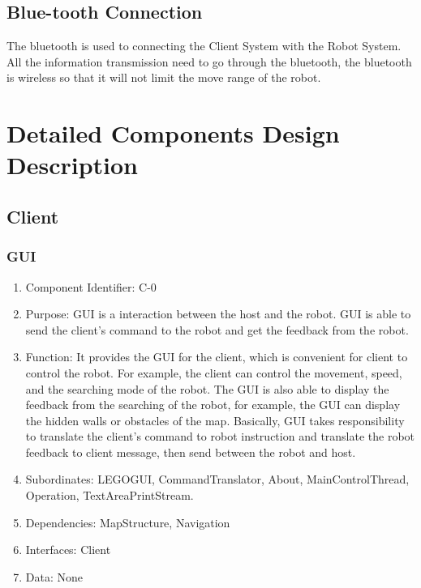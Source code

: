 \documentclass[11pt, a4paper]{report}
\begin{document}
\subsection{Blue-tooth Connection}
The bluetooth is used to connecting the Client System with the Robot System. All the information transmission need to go through the bluetooth, the bluetooth is wireless so that it will not limit the move range of the robot.   



\section{Detailed Components Design Description}
\subsection{Client}
\subsubsection{GUI}
\begin{enumerate}
\item Component Identifier: C-0
\item Purpose: GUI is a interaction between the host and the robot. GUI is able to send the client's command to the robot and get the feedback from the robot.  
\item Function: It provides the GUI for the client, which is convenient for client to control the robot. For example, the client can control the movement, speed, and the searching mode of the robot. The GUI is also able to display the feedback from the searching of the robot, for example, the GUI can display the hidden walls or obstacles of the map. Basically, GUI takes responsibility to translate the client's command to robot instruction and translate the robot feedback to client message, then send between the robot and host.   
\item Subordinates: LEGOGUI, CommandTranslator, About, MainControlThread, Operation, TextAreaPrintStream. 
\item Dependencies: MapStructure, Navigation
\item Interfaces: Client
\item Data: None
\end{enumerate}
\end{document}
